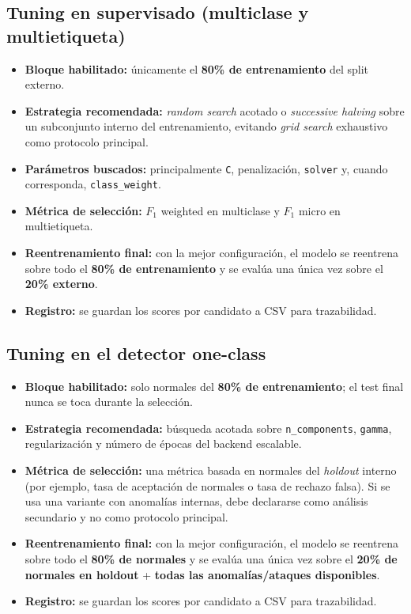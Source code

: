 \documentclass[12pt,oneside]{report}
\begin{document}
\subsection{Tuning en supervisado (multiclase y multietiqueta)}
\begin{itemize}[leftmargin=*]
  \item \textbf{Bloque habilitado:} únicamente el \textbf{80\% de entrenamiento} del split externo.
  \item \textbf{Estrategia recomendada:} \textit{random search} acotado o \textit{successive halving} sobre un subconjunto interno del entrenamiento, evitando \textit{grid search} exhaustivo como protocolo principal.
  \item \textbf{Parámetros buscados:} principalmente \texttt{C}, penalización, \texttt{solver} y, cuando corresponda, \texttt{class\_weight}.
  \item \textbf{Métrica de selección:} $F_1$ weighted en multiclase y $F_1$ micro en multietiqueta.
  \item \textbf{Reentrenamiento final:} con la mejor configuración, el modelo se reentrena sobre todo el \textbf{80\% de entrenamiento} y se evalúa una única vez sobre el \textbf{20\% externo}.
  \item \textbf{Registro:} se guardan los scores por candidato a CSV para trazabilidad.
\end{itemize}

\subsection{Tuning en el detector one-class}
\begin{itemize}[leftmargin=*]
  \item \textbf{Bloque habilitado:} solo normales del \textbf{80\% de entrenamiento}; el test final nunca se toca durante la selección.
  \item \textbf{Estrategia recomendada:} búsqueda acotada sobre \texttt{n\_components}, \texttt{gamma}, regularización y número de épocas del backend escalable. 
  \item \textbf{Métrica de selección:} una métrica basada en normales del \textit{holdout} interno (por ejemplo, tasa de aceptación de normales o tasa de rechazo falsa). Si se usa una variante con anomalías internas, debe declararse como análisis secundario y no como protocolo principal.
  \item \textbf{Reentrenamiento final:} con la mejor configuración, el modelo se reentrena sobre todo el \textbf{80\% de normales} y se evalúa una única vez sobre el \textbf{20\% de normales en holdout} + \textbf{todas las anomalías/ataques disponibles}.
  \item \textbf{Registro:} se guardan los scores por candidato a CSV para trazabilidad.
\end{itemize}
\end{document}
